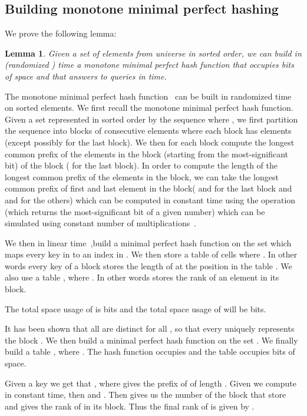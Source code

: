 \documentclass[a4paper]{article}
\newtheorem{lemma}{Lemma}
\begin{document}
\begin{enumerate}
\subsection{Building monotone minimal perfect hashing}
\label{sec:build_mmphf}
We prove the following lemma:


\begin{lemma}
\label{lemma:build_mmphf}
Given a set  of  elements from universe  in sorted order, we can build in 
(randomized ) time a monotone minimal perfect hash function that occupies 
bits of space and that answers to queries in  time. 
\end{lemma}
The monotone minimal perfect hash function~\cite{BBPV09} can be built in randomized  time on  sorted elements. 
We first recall the monotone minimal perfect hash function. Given a set  represented in sorted 
order by the sequence 
where , we first partition the sequence into  blocks
of consecutive elements where each block has  elements (except possibly for the last block). 
We then for each block  compute  the longest common prefix of the elements 
in the block (starting from the most-significant bit)
of the block  ( for the last block). 
In order to compute the length of the longest common prefix of the elements in the block, 
we can take the longest common prefix of first and last element in the block(
 and  for the last block and  and 
for the others) which can be computed
in constant time using the  operation (which returns the most-significant bit 
of a given number) which can be simulated using constant number of multiplications~\cite{brodnik1993computation}. 

We then in linear time~\cite{HT01},build a minimal perfect hash function  on the set 
 which maps every key in  to an index 
in . We then store a table  of cells where . 
In other words every key of a block  stores the length of  at the position  in the table .
We also use a table , where . In other words  stores 
the rank of an element in its block.
 
The total space usage of  is  bits and the total space usage of  will be  bits. 

It has been shown that all  are distinct for all , so that every  
uniquely represents the block . We then build a minimal perfect hash function  on the set 
. We finally build a table , 
where . The hash function  occupies 
and the table  occupies  bits of space. 

Given a key  we get that , where 
gives the prefix of  of length . Given  we compute  in constant time, 
then  and . Then  gives us the number of the block 
that store  and  gives the rank of  in its block. Thus the final rank of  
is given by .


\end{enumerate}
\end{document}
